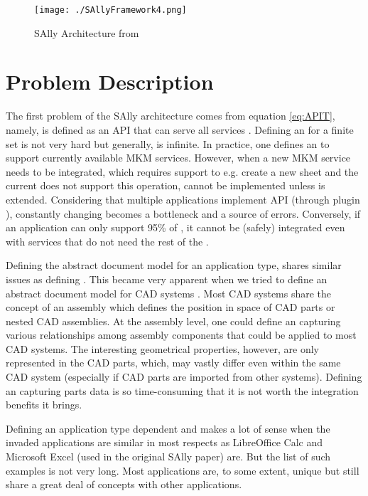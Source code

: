 \documentclass{llncs}
\begin{document}
\begin{figure}
\centering
\texttt{[image: ./SAllyFramework4.png]}
\caption{SAlly Architecture from \cite{DavJucKoh:safusa12}}
\label{fig:sally_arch}
\end{figure}

\section{Problem Description}
\label{problem_desc}


The first problem of the SAlly architecture comes from equation \ref{eq:APIT}, namely,  is defined as an API that can serve all services . Defining an  for a finite set  is not very hard but generally,  is infinite. In practice, one defines an  to support currently available MKM services. However, when a new MKM service needs to be integrated, which requires support to e.g. create a new sheet and the current  does not support this operation,  cannot be implemented unless  is extended. Considering that multiple applications implement API  (through plugin ), constantly changing  becomes a bottleneck and a source of errors. Conversely, if an application can only support 95\% of , it cannot be (safely) integrated even with services that do not need the rest  of the . 

Defining the abstract document model  for an application type, shares similar issues as defining . This became very apparent when we tried to define an abstract document model for CAD systems \cite{KohlhaseEtAl:FullSemanticTransparency:2013}. Most CAD systems share the concept of an assembly which defines the position in space of CAD parts or nested CAD assemblies. At the assembly level, one could define an  capturing various relationships among assembly components that could be applied to most CAD systems. The interesting geometrical properties, however, are only represented in the CAD parts, which, may vastly differ even within the same CAD system (especially if CAD parts are imported from other systems). Defining an  capturing parts data is so time-consuming that it is not worth the integration benefits it brings.

Defining an application type dependent  and  makes a lot of sense when the invaded applications are similar in most respects as LibreOffice Calc and Microsoft Excel (used in the original SAlly paper) are. But the list of such examples is not very long. Most applications are, to some extent, unique but still share a great deal of concepts with other applications. 
\end{document}
